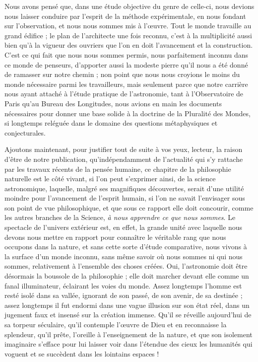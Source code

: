 \documentclass[a4paper, 11pt, oneside]{article}
\begin{document}
Nous avons pensé que, dans une étude objective du genre de celle-ci, nous devions nous laisser conduire par l'esprit de la méthode expérimentale, en nous fondant sur l'observation, et nous nous sommes mis à l'œuvre. Tout le monde travaille au grand édifice ; le plan de l'architecte une fois reconnu, c'est à la multiplicité aussi bien qu'à la vigueur des ouvriers que l'on en doit l'avancement et la construction. C'est ce qui fait que nous nous sommes permis, nous parfaitement inconnu dans ce monde de penseurs, d'apporter aussi la modeste pierre qu'il nous a été donné de ramasser sur notre chemin ; non point que nous nous croyions le moins du monde nécessaire parmi les travailleurs, mais seulement parce que notre carrière nous ayant attaché à l'étude pratique de l'astronomie, tant à l'Observatoire de Paris qu'au Bureau des Longitudes, nous avions en main les documents nécessaires pour donner une base solide à la doctrine de la Pluralité des Mondes, si longtemps reléguée dans le domaine des questions métaphysiques et conjecturales.

Ajoutons maintenant, pour justifier tout de suite à vos yeux, lecteur, la raison d'être de notre publication, qu'indépendamment de l'actualité qui s'y rattache par les travaux récents de la pensée humaine, ce chapitre de la philosophie naturelle est le côté vivant, si l'on peut s'exprimer ainsi, de la science astronomique, laquelle, malgré ses magnifiques découvertes, serait d'une utilité moindre pour l'avancement de l'esprit humain, si l'on ne savait l'envisager sous son point de vue philosophique, et que sous ce rapport elle doit concourir, comme les autres branches de la Science, \emph{à nous apprendre ce que nous sommes}. Le spectacle de l'univers extérieur est, en effet, la grande unité avec laquelle nous devons nous mettre en rapport pour connaître le véritable rang que nous occupons dans la nature, et sans cette sorte d'étude comparative, nous vivons à la surface d'un monde inconnu, sans même savoir où nous sommes ni qui nous sommes, relativement à l'ensemble des choses créées. Oui, l'astronomie doit être désormais la boussole de la philosophie ; elle doit marcher devant elle comme un fanal illuminateur, éclairant les voies du monde. Assez longtemps l'homme est resté isolé dans sa vallée, ignorant de son passé, de son avenir, de sa destinée ; assez longtemps il fut endormi dans une vague illusion sur son état réel, dans un jugement faux et insensé sur la création immense. Qu'il se réveille aujourd'hui de sa torpeur séculaire, qu'il contemple l'œuvre de Dieu et en reconnaisse la splendeur, qu'il prête, l'oreille à l'enseignement de la nature, et que son isolement imaginaire s'efface pour lui laisser voir dans l'étendue des cieux les humanités qui voguent et se succèdent dans les lointains espaces !
\end{document}
